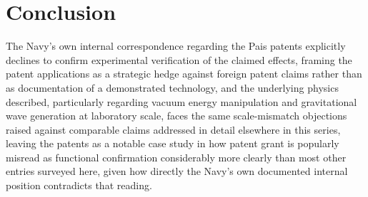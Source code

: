 \documentclass[11pt]{article}
\begin{document}
\section{Conclusion}

The Navy's own internal correspondence regarding the Pais patents explicitly declines to confirm experimental verification of the claimed effects, framing the patent applications as a strategic hedge against foreign patent claims rather than as documentation of a demonstrated technology, and the underlying physics described, particularly regarding vacuum energy manipulation and gravitational wave generation at laboratory scale, faces the same scale-mismatch objections raised against comparable claims addressed in detail elsewhere in this series, leaving the patents as a notable case study in how patent grant is popularly misread as functional confirmation considerably more clearly than most other entries surveyed here, given how directly the Navy's own documented internal position contradicts that reading.
\end{document}
